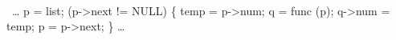 {\tt
\begin{program}{20}
  \FL\ \ldots
   p = list;
   \WHILE (p->next != NULL) \{
       temp = p->num;
      q = func (p);
       q->num = temp;
       p = p->next;
   \}
   \ldots
\end{program}
}
